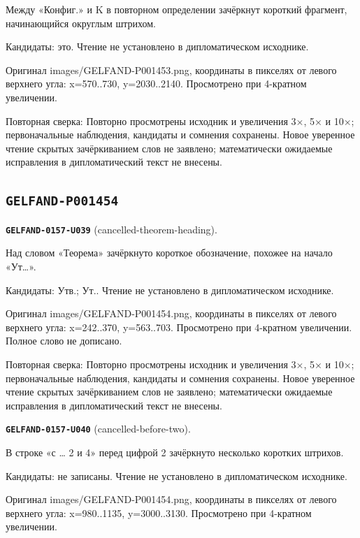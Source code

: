 Между «Конфиг.» и K в повторном определении зачёркнут короткий фрагмент, начинающийся округлым штрихом.\par
Кандидаты: это. Чтение не установлено в дипломатическом исходнике.\par
Оригинал images/GELFAND-P001453.png, координаты в пикселях от левого верхнего угла: x=570..730, y=2030..2140. Просмотрено при 4-кратном увеличении.\par
Повторная сверка: Повторно просмотрены исходник и увеличения 3×, 5× и 10×; первоначальные наблюдения, кандидаты и сомнения сохранены. Новое уверенное чтение скрытых зачёркиванием слов не заявлено; математически ожидаемые исправления в дипломатический текст не внесены.\par\medskip
\subsection*{\texttt{GELFAND-P001454}}
\par\noindent\leavevmode{}\label{GELFAND-0157-U039}\label{GELFAND-P001454:cancelled-theorem-heading}\textbf{\texttt{GELFAND-0157-U039}} (cancelled-theorem-heading).\nopagebreak[4]\par
Над словом «Теорема» зачёркнуто короткое обозначение, похожее на начало «Ут…».\par
Кандидаты: Утв.; Ут.. Чтение не установлено в дипломатическом исходнике.\par
Оригинал images/GELFAND-P001454.png, координаты в пикселях от левого верхнего угла: x=242..370, y=563..703. Просмотрено при 4-кратном увеличении. Полное слово не дописано.\par
Повторная сверка: Повторно просмотрены исходник и увеличения 3×, 5× и 10×; первоначальные наблюдения, кандидаты и сомнения сохранены. Новое уверенное чтение скрытых зачёркиванием слов не заявлено; математически ожидаемые исправления в дипломатический текст не внесены.\par\medskip
\par\noindent\leavevmode{}\label{GELFAND-0157-U040}\label{GELFAND-P001454:cancelled-before-two}\textbf{\texttt{GELFAND-0157-U040}} (cancelled-before-two).\nopagebreak[4]\par
В строке «с … 2 и 4» перед цифрой 2 зачёркнуто несколько коротких штрихов.\par
Кандидаты: не записаны. Чтение не установлено в дипломатическом исходнике.\par
Оригинал images/GELFAND-P001454.png, координаты в пикселях от левого верхнего угла: x=980..1135, y=3000..3130. Просмотрено при 4-кратном увеличении.\par
